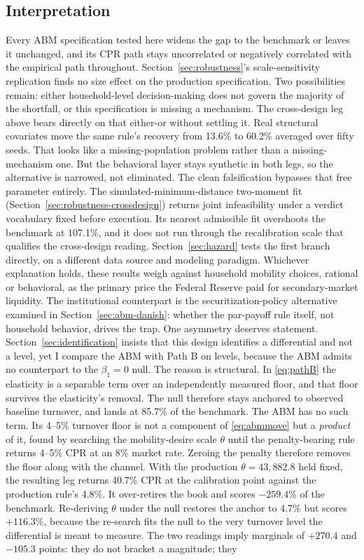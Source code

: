 \documentclass[12pt]{article}
\begin{document}
\subsection{Interpretation}\label{sec:abm-interp}

Every ABM specification tested here widens the gap to the benchmark or leaves it unchanged, and its CPR path stays uncorrelated or negatively correlated with the empirical path throughout. Section~\ref{sec:robustness}'s scale-sensitivity replication finds no size effect on the production specification. Two possibilities remain: either household-level decision-making does not govern the majority of the shortfall, or this specification is missing a mechanism. The cross-design leg above bears directly on that either-or without settling it. Real structural covariates move the same rule's recovery from 13.6\% to 60.2\% averaged over fifty seeds. That looks like a missing-population problem rather than a missing-mechanism one. But the behavioral layer stays synthetic in both legs, so the alternative is narrowed, not eliminated. The clean falsification bypasses that free parameter entirely. The simulated-minimum-distance two-moment fit (Section~\ref{sec:robustness-crossdesign}) returns joint infeasibility under a verdict vocabulary fixed before execution. Its nearest admissible fit overshoots the benchmark at 107.1\%, and it does not run through the recalibration scale that qualifies the cross-design reading. Section~\ref{sec:hazard} tests the first branch directly, on a different data source and modeling paradigm. Whichever explanation holds, these results weigh against household mobility choices, rational or behavioral, as the primary price the Federal Reserve paid for secondary-market liquidity. The institutional counterpart is the securitization-policy alternative examined in Section~\ref{sec:abm-danish}: whether the par-payoff rule itself, not household behavior, drives the trap. One asymmetry deserves statement. Section~\ref{sec:identification} insists that this design identifies a differential and not a level, yet I compare the ABM with Path B on levels, because the ABM admits no counterpart to the $\beta_1 = 0$ null. The reason is structural. In \eqref{eq:pathB} the elasticity is a separable term over an independently measured floor, and that floor survives the elasticity's removal. The null therefore stays anchored to observed baseline turnover, and lands at 85.7\% of the benchmark. The ABM has no such term. Its 4--5\% turnover floor is not a component of \eqref{eq:abmmove} but a \emph{product} of it, found by searching the mobility-desire scale $\theta$ until the penalty-bearing rule returns 4--5\% CPR at an 8\% market rate. Zeroing the penalty therefore removes the floor along with the channel. With the production $\theta = 43{,}882.8$ held fixed, the resulting leg returns 40.7\% CPR at the calibration point against the production rule's 4.8\%. It over-retires the book and scores $-259.4$\% of the benchmark. Re-deriving $\theta$ under the null restores the anchor to 4.7\% but scores $+116.3$\%, because the re-search fits the null to the very turnover level the differential is meant to measure. The two readings imply marginals of $+270.4$ and $-105.3$ points: they do not bracket a magnitude; they 
\end{document}
